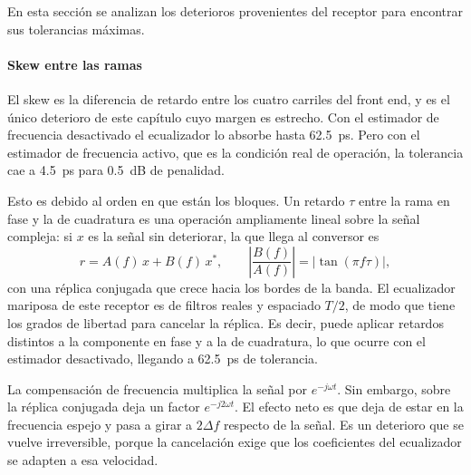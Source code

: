 En esta secci\'on se analizan los deterioros provenientes del
receptor para encontrar sus tolerancias m\'aximas.

\paragraph{Skew entre las ramas}
El skew es la diferencia de retardo entre los cuatro carriles del front end, y
es el \'unico deterioro de este cap\'itulo cuyo margen es estrecho. Con el
estimador de frecuencia desactivado el ecualizador lo absorbe hasta
\SI{62.5}{\pico\second}. Pero con el estimador de frecuencia activo, que es la condici\'on
real de operaci\'on, la tolerancia cae a \SI{4.5}{\pico\second} para
\SI{0.5}{\dB} de penalidad.

Esto es debido al orden en que est\'an los bloques. Un retardo $\tau$ entre la rama en
fase y la de cuadratura es una operaci\'on ampliamente lineal sobre la se\~nal
compleja: si $x$ es la se\~nal sin deteriorar, la que llega al conversor es
\begin{equation}
  r = A(f)\,x + B(f)\,x^{*},
  \qquad
  \left|\frac{B(f)}{A(f)}\right| = \left|\tan(\pi f \tau)\right|,
  \label{eq:tol-skew-wl}
\end{equation}
con una r\'eplica conjugada que crece hacia los bordes de la banda. El
ecualizador mariposa de este receptor es de filtros reales y espaciado $T/2$,
de modo que tiene los grados de libertad para cancelar la r\'eplica. Es decir, puede
aplicar retardos distintos a la componente en fase y a la de cuadratura, lo que ocurre con el
estimador desactivado, llegando a \SI{62.5}{\pico\second} de tolerancia.

La compensaci\'on de frecuencia multiplica la se\~nal por $e^{-j\omega t}$.
Sin embargo, sobre la r\'eplica
conjugada deja un factor $e^{-j2\omega t}$. El efecto neto es que deja de estar en la frecuencia espejo y pasa a girar a $2\Delta f$ respecto de la se\~nal. Es un deterioro que se vuelve irreversible, porque la cancelaci\'on exige que los coeficientes del ecualizador se adapten a esa velocidad.

